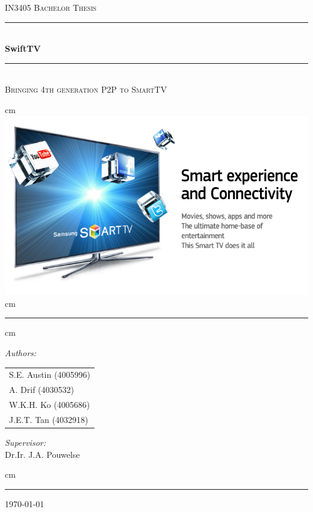 \documentclass[a4paper]{report}
\begin{document}
\begin{titlepage}
			\begin{center}
			\textsc{\LARGE {IN3405 Bachelor Thesis}}\\[1cm]
			\rule{\linewidth}{0.5mm} \\[0.4cm]

			{\Huge \bfseries SwiftTV}\\[0.15cm]

			\rule{\linewidth}{0.5mm} \\
			\textsc{\large{Bringing 4th generation P2P to SmartTV}}
			
			 cm
			\includegraphics[scale=0.5]{Images/title.jpg}
			 cm
				\rule{\linewidth}{0.5mm}
			
			 cm
			
			\begin{minipage}{0.4\textwidth}
				\begin{flushleft} \large
					\emph{Authors:}\\
					\begin{tabular}{l}
						S.E. Austin (4005996) \\
						A. Drif (4030532) \\
						W.K.H. Ko (4005686) \\
						J.E.T. Tan (4032918)
					\end{tabular}
				\end{flushleft}
			\end{minipage}
			\hspace{1cm}
			\begin{minipage}{0.4\textwidth}
				\begin{flushright} \large
					\emph{Supervisor:} \\
					Dr.Ir. J.A. Pouwelse
				\end{flushright}
				
			\end{minipage}
			 cm
			
			\rule{\linewidth}{0.5mm}
			
			\large \today
			\end{center}
\end{titlepage}



\tableofcontents













\printbibliography
\end{document}
